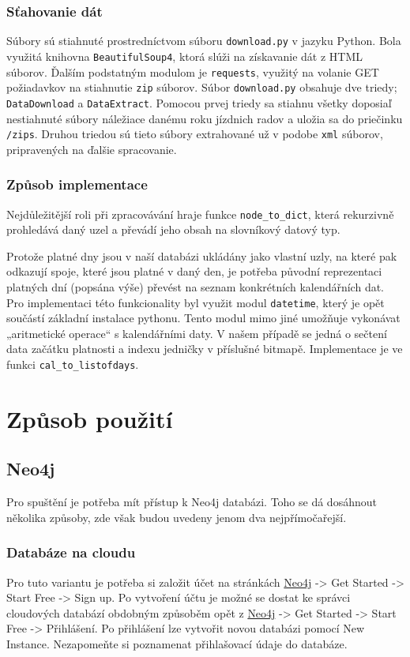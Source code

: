 \documentclass[10pt,xcolor=pdflatex,dvipsnames,table,oneside]{book}
\begin{document}
\subsection{Sťahovanie dát}
Súbory sú stiahnuté prostredníctvom súboru \verb|download.py| v jazyku Python. Bola využitá knihovna \verb|BeautifulSoup4|, ktorá slúži na získavanie dát z HTML súborov. Ďalším podstatným modulom je \verb|requests|, využitý na volanie GET požiadavkov na stiahnutie \verb|zip| súborov. Súbor \verb|download.py| obsahuje dve triedy; \verb|DataDownload| a \verb|DataExtract|. Pomocou prvej triedy sa stiahnu všetky doposiaľ nestiahnuté súbory náležiace danému roku jízdnich radov a uložia sa do priečinku \verb|/zips|. Druhou triedou sú tieto súbory extrahované už v podobe \verb|xml| súborov, pripravených na ďalšie spracovanie.

\subsection{Způsob implementace}
Nejdůležitější roli při zpracovávání hraje funkce \verb|node_to_dict|, která rekurzivně prohledává daný uzel a převádí jeho obsah na slovníkový datový typ.

Protože platné dny jsou v naší databázi ukládány jako vlastní uzly, na které pak odkazují spoje, které jsou platné v daný den, je potřeba původní reprezentaci platných dní (popsána výše) převést na seznam konkrétních kalendářních dat. Pro implementaci této funkcionality byl využit modul \verb|datetime|, který je opět součástí základní instalace pythonu. Tento modul mimo jiné umožňuje vykonávat „aritmetické operace“ s kalendářními daty. V našem případě se jedná o sečtení data začátku platnosti a indexu jedničky v příslušné bitmapě. Implementace je ve funkci \verb|cal_to_listofdays|.

\chapter{Způsob použití}

\section{Neo4j}

Pro spuštění je potřeba mít přístup k Neo4j databázi. Toho se dá dosáhnout několika způsoby, zde však budou uvedeny
jenom dva nejpřímočařejší.

\subsection{Databáze na cloudu}
Pro tuto variantu je potřeba si založit účet na stránkách \href{https://neo4j.com/}{Neo4j} -> Get Started -> Start Free -> Sign up.
Po vytvoření účtu je možné se dostat ke správci cloudových databází obdobným způsoběm opět z \href{https://neo4j.com/}{Neo4j} ->
Get Started -> Start Free -> Přihlášení. Po přihlášení lze vytvořit novou databázi pomocí New Instance. Nezapomeňte si
poznamenat přihlašovací údaje do databáze.
\end{document}
